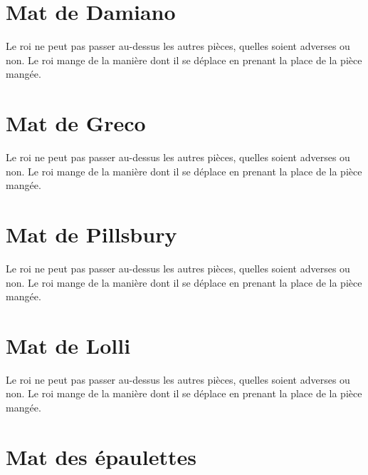 \documentclass[a5paper,openany,twocolumn]{book}%
\begin{document}

\chapter{Mat de Damiano}
 
Le roi ne peut pas passer au-dessus les autres pièces, quelles soient adverses ou non. Le roi mange de la manière dont il se déplace en prenant la place de la pièce mangée. 


\chapter{Mat de Greco}
 
Le roi ne peut pas passer au-dessus les autres pièces, quelles soient adverses ou non. Le roi mange de la manière dont il se déplace en prenant la place de la pièce mangée. 


\chapter{Mat de Pillsbury}

Le roi ne peut pas passer au-dessus les autres pièces, quelles soient adverses ou non. Le roi mange de la manière dont il se déplace en prenant la place de la pièce mangée. 


\chapter{Mat de Lolli}

Le roi ne peut pas passer au-dessus les autres pièces, quelles soient adverses ou non. Le roi mange de la manière dont il se déplace en prenant la place de la pièce mangée. 


\chapter{Mat des épaulettes}
 
\end{document}
